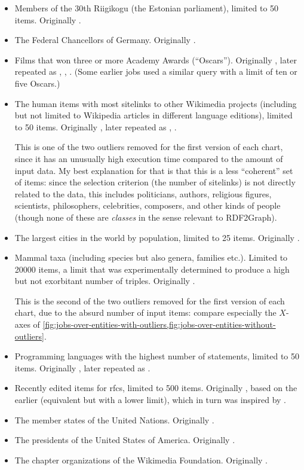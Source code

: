 \begin{itemize}
\item Members of the 30th Riigikogu (the Estonian parliament),
  limited to 50 \glspl{item}.
  Originally .
\item The Federal Chancellors of Germany.
  Originally .
\item Films that won three or more Academy Awards (“Oscars”).
  Originally , later repeated as , , .
  (Some earlier jobs used a similar query with a limit of ten or five Oscars.)
\item The human \glspl{item} with most \glspl{sitelink} to other \gls{Wikimedia} projects
  (including but not limited to \gls{Wikipedia} articles in different language editions),
  limited to 50 \glspl{item}.
  Originally , later repeated as , .

  This is one of the two outliers removed for the first version of each chart,
  since it has an unusually high execution time compared to the amount of input data.
  My best explanation for that is that this is a less “coherent” set of \glspl{item}:
  since the selection criterion (the number of sitelinks) is not directly related to the data,
  this includes politicians, authors, religious figures, scientists, philosophers, celebrities, composers, and other kinds of people
  (though none of these are \emph{classes} in the sense relevant to \gls{RDF2Graph}).
\item The largest cities in the world by population,
  limited to 25 \glspl{item}.
  Originally .
\item Mammal taxa (including species but also genera, families etc.).
  Limited to \num{20000} \glspl{item},
  a limit that was experimentally determined to produce a high but not exorbitant number of triples.
  Originally .

  This is the second of the two outliers removed for the first version of each chart,
  due to the absurd number of input \glspl{item}:
  compare especially the $X$-axes of
  \cref{fig:jobs-over-entities-with-outliers,fig:jobs-over-entities-without-outliers}.
\item Programming languages with the highest number of \glspl{statement},
  limited to 50 \glspl{item}.
  Originally , later repeated as .
\item Recently edited \glspl{item} for \glspl{rfc},
  limited to 500 \glspl{item}.
  Originally , based on the earlier  (equivalent but with a lower limit),
  which in turn was inspired by .
\item The member states of the United Nations.
  Originally .
\item The presidents of the United States of America.
  Originally .
\item The chapter organizations of the \gls{Wikimedia Foundation}.
  Originally .
\end{itemize}

